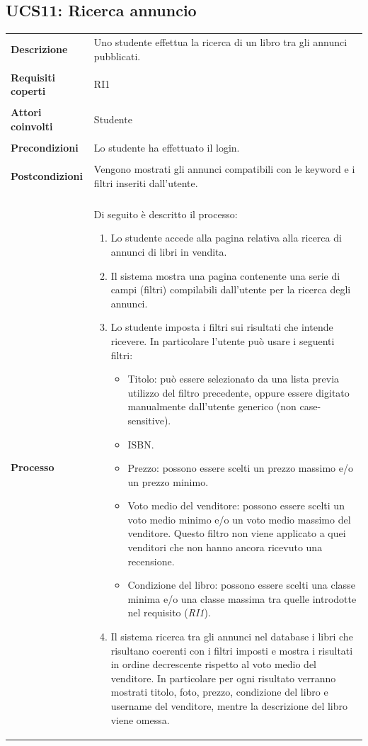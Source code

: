 \documentclass[10pt,a4paper]{report}
\begin{document}
	\subsection{UCS11: Ricerca annuncio}
	\begin{tabular}{lp{}}
		\textbf{Descrizione}&Uno studente effettua la ricerca di un libro tra gli annunci pubblicati.\\
		\\
		\textbf{Requisiti coperti}&RI1\\
		\\
		\textbf{Attori coinvolti}&Studente\\
		\\
		\textbf{Precondizioni}&Lo studente ha effettuato il login.\\
		\\
		\textbf{Postcondizioni}&Vengono mostrati gli annunci compatibili con le keyword e i filtri inseriti dall'utente.\\
		\\
		\textbf{Processo}&Di seguito è descritto il processo:
		\begin{enumerate}
			\item Lo studente accede alla pagina relativa alla ricerca di annunci di libri in vendita.
			\item Il sistema mostra una pagina contenente una serie di campi (filtri) compilabili dall'utente per la ricerca degli annunci.
			\item Lo studente imposta i filtri sui risultati che intende ricevere. In particolare l'utente può usare i seguenti filtri:
			\begin{itemize}
				\item Titolo: può essere selezionato da una lista previa utilizzo del filtro precedente, oppure essere digitato manualmente dall'utente generico (non case-sensitive).
				\item ISBN.
				\item Prezzo: possono essere scelti un prezzo massimo e/o un prezzo minimo.
				\item Voto medio del venditore: possono essere scelti un voto medio minimo e/o un voto medio massimo del venditore. Questo filtro non viene applicato a quei venditori che non hanno ancora ricevuto una recensione.
				\item Condizione del libro: possono essere scelti una classe minima e/o una classe massima tra quelle introdotte nel requisito (\textit{RI1}).			
			\end{itemize}
			\item Il sistema ricerca tra gli annunci nel database i libri che risultano coerenti con i filtri imposti e mostra i risultati in ordine decrescente rispetto al voto medio del venditore. In particolare per ogni risultato verranno mostrati titolo, foto, prezzo, condizione del libro e username del venditore, mentre la descrizione del libro viene omessa.

\end{enumerate}
\end{tabular}
\end{document}
